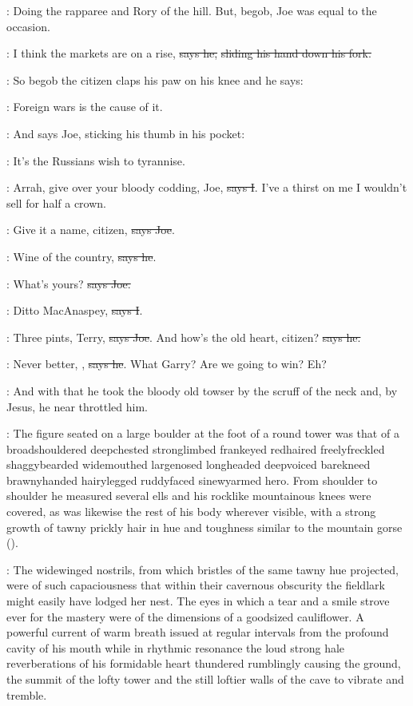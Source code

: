 \Nq:
Doing the rapparee and Rory of the hill. But, begob, Joe was equal to
the occasion.

\joe:
I think the markets are on a rise, \sout{says he,}
\sout{sliding his hand down his fork.}

\Nq:
So begob the citizen claps his paw on his knee and he says:

\citizen:
Foreign wars is the cause of it.

\Nq:
And says Joe, sticking his thumb in his pocket:

\joe:
It's the Russians wish to tyrannise.

:
Arrah, give over your bloody codding, Joe, \sout{says I}.
I've a thirst on me I
wouldn't sell for half a crown.

\joe:
Give it a name, citizen, \sout{says Joe}.

\citizen:
Wine of the country, \sout{says he}.

\joe:
What's yours? \sout{says Joe.}

:
Ditto MacAnaspey, \sout{says I}.

\joe:
Three pints, Terry, \sout{says Joe}.
And how's the old heart, citizen? \sout{says he.}

\citizen:
Never better, , \sout{says he}.
What Garry? Are we going to win? Eh?

\Nq:
And with that he took the bloody old towser by the scruff of the neck
and, by Jesus,
he near throttled him.

:
The figure seated on a large boulder at the foot of a round tower
was that of a broadshouldered deepchested stronglimbed frankeyed
redhaired freelyfreckled shaggybearded widemouthed largenosed
longheaded deepvoiced barekneed brawnyhanded hairylegged ruddyfaced
sinewyarmed hero. From shoulder to shoulder he measured several ells and
his rocklike mountainous knees were covered, as was likewise the rest of
his body wherever visible, with a strong growth of tawny prickly hair in
hue and toughness similar to the mountain gorse
().

:
The widewinged nostrils, from which bristles of the same tawny hue projected,
were of such capaciousness
that within their cavernous obscurity the
fieldlark might easily have lodged her nest. The eyes in which a tear and
a smile strove ever for the mastery were of the dimensions of a goodsized
cauliflower. A powerful current of warm breath issued at regular intervals
from the profound cavity of his mouth while in rhythmic resonance the
loud strong hale reverberations of his formidable heart thundered
rumblingly causing the ground, the summit of the lofty tower and the still
loftier walls of the cave to vibrate and tremble.

